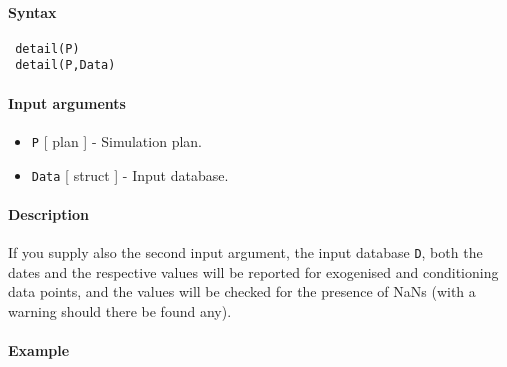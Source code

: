 


	\paragraph{Syntax}
 
 \begin{verbatim}
 detail(P)
 detail(P,Data)
 \end{verbatim}
 
 \paragraph{Input arguments}
 
 \begin{itemize}
 \item
   \texttt{P} {[} plan {]} - Simulation plan.
 \item
   \texttt{Data} {[} struct {]} - Input database.
 \end{itemize}
 
 \paragraph{Description}
 
 If you supply also the second input argument, the input database
 \texttt{D}, both the dates and the respective values will be reported
 for exogenised and conditioning data points, and the values will be
 checked for the presence of NaNs (with a warning should there be found
 any).
 
 \paragraph{Example}


